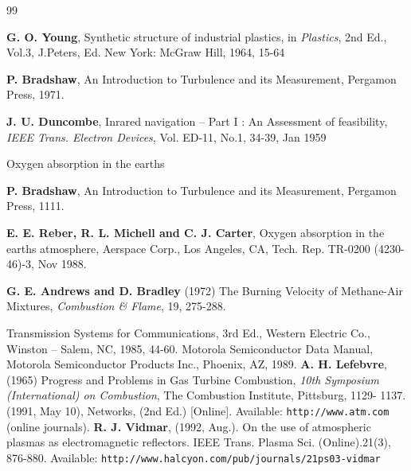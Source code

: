 \newpage
\renewcommand{\bibname}{References}
\begin{thebibliography}{99}




{\bfseries G. O. Young}, Synthetic structure of industrial plastics, in {\em Plastics}, 2nd Ed., Vol.3,
J.Peters, Ed. New York: McGraw Hill, 1964, 15-64

{\bfseries P. Bradshaw},  An Introduction to Turbulence and its Measurement, Pergamon Press,
1971.

{\bfseries J. U. Duncombe}, Inrared navigation – Part I : An Assessment of feasibility, {\em IEEE
Trans. Electron Devices}, Vol. ED-11, No.1, 34-39, Jan 1959

Oxygen absorption in the earths

{\bfseries P. Bradshaw},  An Introduction to Turbulence and its Measurement, Pergamon Press,
1111.

{\bfseries E. E. Reber, R. L. Michell and C. J. Carter}, Oxygen absorption in the earths
atmosphere, Aerspace Corp., Los Angeles, CA, Tech. Rep. TR-0200 (4230-46)-3, Nov
1988.

{\bfseries G. E. Andrews and D. Bradley} (1972) The Burning Velocity of Methane-Air Mixtures,
{\em Combustion \& Flame}, 19, 275-288.

Transmission Systems for Communications, 3rd Ed., Western Electric Co., Winston –
Salem, NC, 1985, 44-60.
Motorola Semiconductor Data Manual, Motorola Semiconductor Products Inc.,
Phoenix, AZ, 1989.
{\bfseries A. H. Lefebvre}, (1965) Progress and Problems in Gas Turbine Combustion, {\em 10th
Symposium (International) on Combustion}, The Combustion Institute, Pittsburg, 1129-
1137.
 (1991, May 10), Networks, (2nd Ed.) [Online]. Available: {\tt http://www.atm.com} (online journals).
{\bfseries R. J. Vidmar}, (1992, Aug.). On the use of atmospheric plasmas as electromagnetic
reflectors. IEEE Trans. Plasma Sci. (Online).21(3), 876-880. Available:
{\tt http://www.halcyon.com/pub/journals/21ps03-vidmar}
\end{thebibliography}